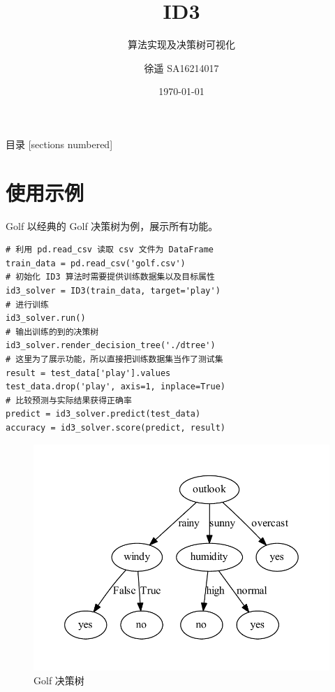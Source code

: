\documentclass[10pt]{beamer}
\title{ID3}
\subtitle{算法实现及决策树可视化}
\date{\today}
\author{徐遥 SA16214017}
\begin{document}
\maketitle

\begin{frame}{目录}
  [sections numbered]
  \tableofcontents[hideallsubsections]
\end{frame}

\section{使用示例}
\begin{frame}{Golf}
以经典的 Golf 决策树为例，展示所有功能。
\begin{verbatim}
# 利用 pd.read_csv 读取 csv 文件为 DataFrame
train_data = pd.read_csv('golf.csv')
# 初始化 ID3 算法时需要提供训练数据集以及目标属性
id3_solver = ID3(train_data, target='play')
# 进行训练
id3_solver.run()
# 输出训练的到的决策树
id3_solver.render_decision_tree('./dtree')
# 这里为了展示功能，所以直接把训练数据集当作了测试集
result = test_data['play'].values
test_data.drop('play', axis=1, inplace=True)
# 比较预测与实际结果获得正确率
predict = id3_solver.predict(test_data)
accuracy = id3_solver.score(predict, result)            
\end{verbatim}

\begin{figure}
  \includegraphics[scale=0.6]{../dtree.pdf}
  \caption{Golf 决策树}
\end{figure}

\end{frame}
\end{document}
